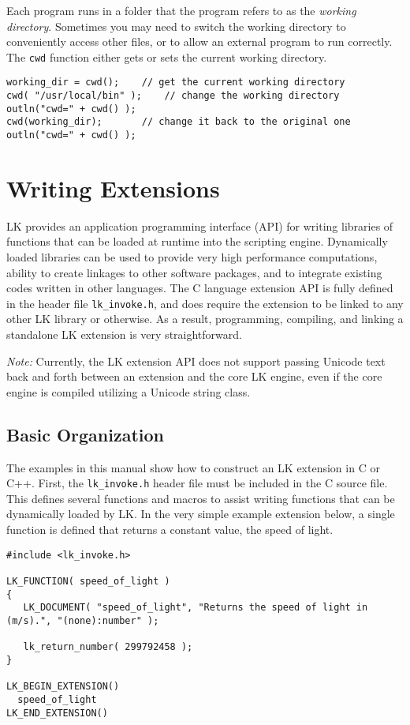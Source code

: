 \documentclass{article}
\begin{document}
Each program runs in a folder that the program refers to as the \emph{working directory}.  Sometimes you may need to switch the working directory to conveniently access other files, or to allow an external program to run correctly.  The \texttt{cwd} function either gets or sets the current working directory.

\begin{verbatim}
working_dir = cwd();    // get the current working directory
cwd( "/usr/local/bin" );    // change the working directory
outln("cwd=" + cwd() );
cwd(working_dir);       // change it back to the original one
outln("cwd=" + cwd() );
\end{verbatim}


\section{Writing Extensions}

LK provides an application programming interface (API) for writing libraries of functions that can be loaded at runtime into the scripting engine.  Dynamically loaded libraries can be used to provide very high performance computations, ability to create linkages to other software packages, and to integrate existing codes written in other languages.  The C language extension API is fully defined in the header file \texttt{lk\_invoke.h}, and does require the extension to be linked to any other LK library or otherwise.  As a result, programming, compiling, and linking a standalone LK extension is very straightforward.  

\emph{Note:} Currently, the LK extension API does not support passing Unicode text back and forth between an extension and the core LK engine, even if the core engine is compiled utilizing a Unicode string class.

\subsection{Basic Organization}

The examples in this manual show how to construct an LK extension in C or C++.  First, the \texttt{lk\_invoke.h} header file must be included in the C source file.  This defines several functions and macros to assist writing functions that can be dynamically loaded by LK.  In the very simple example extension below, a single function is defined that returns a constant value, the speed of light.  

\begin{verbatim}
#include <lk_invoke.h>

LK_FUNCTION( speed_of_light )
{
   LK_DOCUMENT( "speed_of_light", "Returns the speed of light in (m/s).", "(none):number" );

   lk_return_number( 299792458 );
}

LK_BEGIN_EXTENSION()
  speed_of_light
LK_END_EXTENSION()
\end{verbatim}
\end{document}
